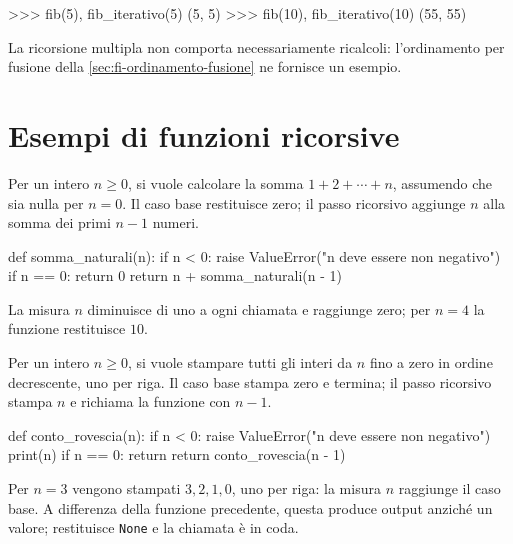 \begin{unipdterminal}
>>> fib(5), fib_iterativo(5)
(5, 5)
>>> fib(10), fib_iterativo(10)
(55, 55)
\end{unipdterminal}

La ricorsione multipla non comporta necessariamente ricalcoli:
l'ordinamento per fusione della \cref{sec:fi-ordinamento-fusione}
ne fornisce un esempio.

\section{Esempi di funzioni ricorsive}
\label{sec:fi-esempi-ricorsione}

Per un intero \(n\ge0\), si vuole calcolare la somma
\(1+2+\cdots+n\), assumendo che sia nulla per \(n=0\).
Il caso base restituisce zero; il passo ricorsivo aggiunge
\(n\) alla somma dei primi \(n-1\) numeri.

\begin{unipdcode}[language=Python]
def somma_naturali(n):
    if n < 0:
        raise ValueError("n deve essere non negativo")
    if n == 0:
        return 0
    return n + somma_naturali(n - 1)
\end{unipdcode}

La misura \(n\) diminuisce di uno a ogni chiamata e raggiunge zero;
per \(n=4\) la funzione restituisce \(10\).

Per un intero \(n\ge0\), si vuole stampare tutti gli interi
da \(n\) fino a zero in ordine decrescente, uno per riga.
Il caso base stampa zero e termina; il passo ricorsivo stampa
\(n\) e richiama la funzione con \(n-1\).

\begin{unipdcode}[language=Python]
def conto_rovescia(n):
    if n < 0:
        raise ValueError("n deve essere non negativo")
    print(n)
    if n == 0:
        return
    return conto_rovescia(n - 1)
\end{unipdcode}

Per \(n=3\) vengono stampati \(3,2,1,0\), uno per riga:
la misura \(n\) raggiunge il caso base. A differenza della
funzione precedente, questa produce output anziché un valore;
restituisce \texttt{None} e la chiamata è in coda.
